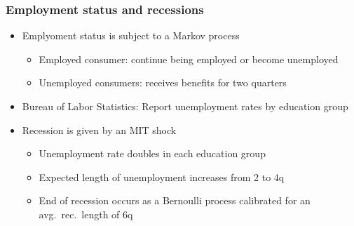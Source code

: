 \documentclass[pdflatex,aspectratio=169]{beamer}
\begin{document}
\begin{frame}
  \frametitle{ Employment status and recessions}
  \begin{itemize}
    \itemsep = \bigskipamount
    \item
          Emplyoment status is subject to a Markov process
          \begin{itemize}
            \itemsep = .5\bigskipamount
            \item
                  Employed consumer: continue being employed or become unemployed
            \item
                  Unemployed consumers: receives benefits for two quarters
          \end{itemize}

    \item
          Bureau of Labor Statistics: Report unemployment rates by education group

    \item
          Recession is given by an MIT shock
          \begin{itemize}
            \itemsep = .5\bigskipamount
            \item
                  Unemployment rate doubles in each education group
            \item
                  Expected length of unemployment increases from 2 to 4q
            \item
                  End of recession occurs as a Bernoulli process calibrated for an avg.\ rec.\ length of 6q
          \end{itemize}
  \end{itemize}
\end{frame}
\end{document}
